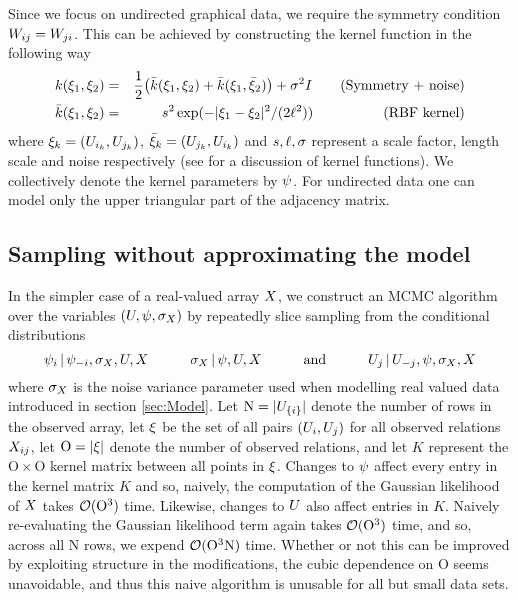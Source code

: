 Since we focus on undirected graphical data, we require the symmetry condition $W_{ij} = W_{ji}$. This can be achieved by constructing the kernel function in the following way \citep[e.g.][]{Duvenaud2014-em}
\begin{eqnarray}
k(\xi_1, \xi_2) & = & \frac{1}{2}\big(\bar{k}(\xi_1, \xi_2) + \bar{k}(\xi_1, \bar{\xi}_2)\big) + \sigma^2I \quad \quad \textrm{(Symmetry + noise)} \\
\bar{k}(\xi_1, \xi_2) & = & s^2\exp(-|\xi_1 - \xi_2|^2/(2\ell^2)) \quad \quad \quad \quad \quad \textrm{(RBF kernel)}
\end{eqnarray}
where $\xi_k = (U_{i_k}, U_{j_k})$, $\bar{\xi}_k= (U_{j_k}, U_{i_k})$ and $s, \ell, \sigma$ represent a scale factor, length scale and noise respectively (see \citep[e.g.][]{Rasmussen2006-ml} for a discussion of kernel functions). We collectively denote the kernel parameters by $\psi$.
For undirected data one can model only the upper triangular part of the adjacency matrix.

\subsection{Sampling without approximating the model}

\newcommand{\numobs}{\mathrm O}
\newcommand{\numnodes}{\mathrm N}
In the simpler case of a real-valued array $X$, we construct an MCMC algorithm over the variables $(U,\psi, \sigma_X)$ by repeatedly slice sampling \citep{Neal2003-zv} from the conditional distributions
\[
\psi_i \,|\, \psi_{-i}, \sigma_X, U, X
\qquad\quad
\sigma_X \,|\, \psi, U, X
\qquad\quad \text{and} \qquad\quad
U_j \,|\, U_{-j}, \psi, \sigma_X, X
\]
where $\sigma_X$ is the noise variance parameter used when modelling real valued data introduced in section \ref{sec:Model}.
Let $\numnodes = |\AHvar_{\lbrace i\rbrace}|$ denote the number of rows in the observed array,
let $\xi$ be the set of all pairs $(U_i,U_j)$ for all observed relations $X_{ij}$, 
let $\numobs = |\inputpoints|$ denote the number of observed relations,
and 
let $K$ represent the $\numobs \times \numobs$ kernel matrix between all points in $\xi$. Changes to $\psi$ affect every entry in the kernel matrix $K$ and so, naively, the computation of the Gaussian likelihood of $X$ takes $\CompOrder(\numobs^3)$ time.  Likewise, changes to $U$ also affect entries in $K$. Naively re-evaluating the Gaussian likelihood term again takes $\CompOrder(\numobs^3)$ time, and so, across all $\numnodes$ rows, we expend $\CompOrder(\numobs^3 \numnodes)$ time. Whether or not this can be improved by exploiting structure in the modifications, the cubic dependence on $\numobs$ seems unavoidable, and thus this naive algorithm is unusable for all but small data sets. 


